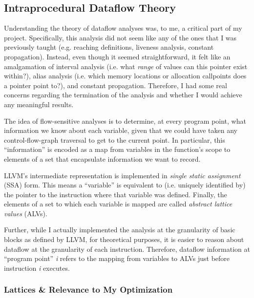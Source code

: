 \documentclass{article}
\begin{document}
    \subsection{Intraprocedural Dataflow Theory}

        Understanding the theory of dataflow analyses was, to me, a critical part
        of my project. Specifically, this analysis did not seem like any of the
        ones that I was previously taught (e.g. reaching definitions, liveness
        analysis, constant propagation). Instead, even though it seemed straightforward, 
        it felt like an amalgamation
        of interval analysis (i.e. what \textit{range} of values can this pointer
        exist within?), alias analysis (i.e. which memory locations or allocation callpoints does a pointer
        point to?), and constant propagation. Therefore, I had some real concerns
        regarding the termination of the analysis and whether I would achieve any
        meaningful results.
        
        \bigbreak{}

        The idea of flow-sensitive analyses is to determine, at every program 
        point, what information we know about each variable, given that we could
        have taken any control-flow-graph traversal to get to the current
        point. In particular, this ``information'' is encoded as a map from
        variables in the function's scope to elements of a set that encapsulate
        information we want to record. 

        \bigbreak{}
        
        LLVM's intermediate representation is
        implemented in \textit{single static assignment} (SSA) form. This means a ``variable''
        is equivalent to (i.e. uniquely identified by) the pointer to the instruction
        where that variable was defined. Finally, the elements of a set to which
        each variable is mapped are called \textit{abstract lattice values} (ALVs).
        
        \bigbreak{}

        Further, while I actually implemented the analysis at the granularity of
        basic blocks as defined by LLVM, for theoretical purposes, it is easier
        to reason about dataflow at the granularity of each instruction. Therefore,
        dataflow information at ``program point'' \textit{i} refers to the
        mapping from variables to ALVs just before instruction \textit{i} executes.

        \subsubsection{Lattices \& Relevance to My Optimization}
\end{document}
